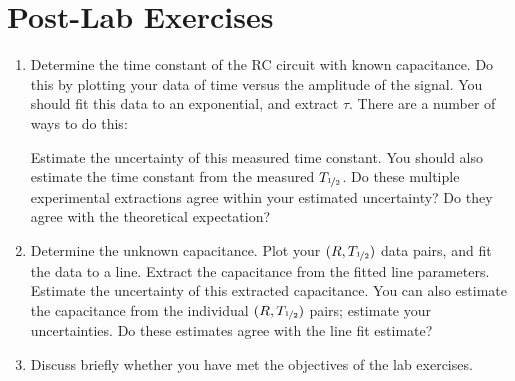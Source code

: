 \documentclass[12pt]{article}
\newcommand{\halflife}{\ensuremath{T_{\nicefrac{1}{2}}}\xspace}
\begin{document}
\section*{Post-Lab Exercises}

\begin{enumerate}
\item Determine the time constant of the RC circuit with known
  capacitance.  Do this by plotting your data of time versus the
  amplitude of the signal.  You should fit this data to an
  exponential, and extract $\tau$.  There are a number of ways to do
  this:
  Estimate the uncertainty of this measured time constant.  You should
  also estimate the time constant from the measured \halflife.  Do
  these multiple experimental extractions agree within your estimated
  uncertainty?  Do they agree with the theoretical expectation?
\item Determine the unknown capacitance.  Plot your $(R, \halflife)$
  data pairs, and fit the data to a line.  Extract the capacitance
  from the fitted line parameters.  Estimate the uncertainty of this
  extracted capacitance.  You can also estimate the capacitance from
  the individual $(R, \halflife)$ pairs; estimate your uncertainties.
  Do these estimates agree with the line fit estimate?
\item Discuss briefly whether you have met the objectives of the lab
  exercises.
\end{enumerate}
\end{document}
